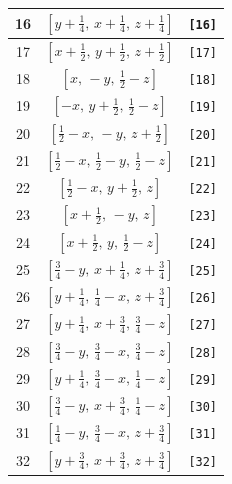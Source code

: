 \documentclass[fleqn,8pt]{jsarticle}
\begin{document}
\begin{longtable}{ccc}
16 & $\left[ y + \frac{1}{4},\, x + \frac{1}{4},\, z + \frac{1}{4} \right]$ & {\tt [16]} \\ \hline
17 & $\left[ x + \frac{1}{2},\, y + \frac{1}{2},\, z + \frac{1}{2} \right]$ & {\tt [17]} \\ \hline
18 & $\left[ x,\, - y,\, \frac{1}{2} - z \right]$ & {\tt [18]} \\ \hline
19 & $\left[ - x,\, y + \frac{1}{2},\, \frac{1}{2} - z \right]$ & {\tt [19]} \\ \hline
20 & $\left[ \frac{1}{2} - x,\, - y,\, z + \frac{1}{2} \right]$ & {\tt [20]} \\ \hline
21 & $\left[ \frac{1}{2} - x,\, \frac{1}{2} - y,\, \frac{1}{2} - z \right]$ & {\tt [21]} \\ \hline
22 & $\left[ \frac{1}{2} - x,\, y + \frac{1}{2},\, z \right]$ & {\tt [22]} \\ \hline
23 & $\left[ x + \frac{1}{2},\, - y,\, z \right]$ & {\tt [23]} \\ \hline
24 & $\left[ x + \frac{1}{2},\, y,\, \frac{1}{2} - z \right]$ & {\tt [24]} \\ \hline
25 & $\left[ \frac{3}{4} - y,\, x + \frac{1}{4},\, z + \frac{3}{4} \right]$ & {\tt [25]} \\ \hline
26 & $\left[ y + \frac{1}{4},\, \frac{1}{4} - x,\, z + \frac{3}{4} \right]$ & {\tt [26]} \\ \hline
27 & $\left[ y + \frac{1}{4},\, x + \frac{3}{4},\, \frac{3}{4} - z \right]$ & {\tt [27]} \\ \hline
28 & $\left[ \frac{3}{4} - y,\, \frac{3}{4} - x,\, \frac{3}{4} - z \right]$ & {\tt [28]} \\ \hline
29 & $\left[ y + \frac{1}{4},\, \frac{3}{4} - x,\, \frac{1}{4} - z \right]$ & {\tt [29]} \\ \hline
30 & $\left[ \frac{3}{4} - y,\, x + \frac{3}{4},\, \frac{1}{4} - z \right]$ & {\tt [30]} \\ \hline
31 & $\left[ \frac{1}{4} - y,\, \frac{3}{4} - x,\, z + \frac{3}{4} \right]$ & {\tt [31]} \\ \hline
32 & $\left[ y + \frac{3}{4},\, x + \frac{3}{4},\, z + \frac{3}{4} \right]$ & {\tt [32]} \\
\end{longtable}
\end{document}
